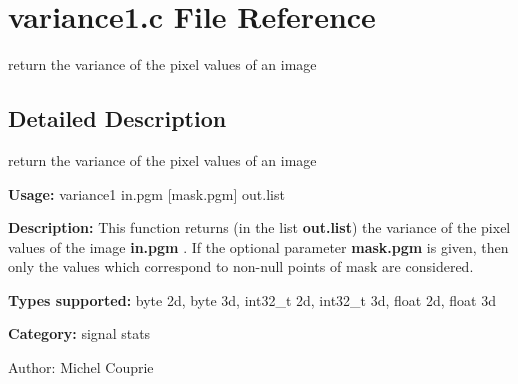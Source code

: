 \section{variance1.c File Reference}
\label{variance1_8c}
return the variance of the pixel values of an image 



\subsection{Detailed Description}
return the variance of the pixel values of an image 

{\bf Usage:} variance1 in.pgm [mask.pgm] out.list

{\bf Description:} This function returns (in the list {\bf out.list}) the variance of the pixel values of the image {\bf in.pgm} . If the optional parameter {\bf mask.pgm} is given, then only the values which correspond to non-null points of mask are considered.

{\bf Types supported:} byte 2d, byte 3d, int32\_\-t 2d, int32\_\-t 3d, float 2d, float 3d

{\bf Category:} signal stats

\begin{Desc}
\item[Author:]Michel Couprie \end{Desc}
